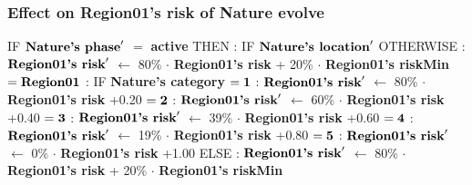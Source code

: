 \documentclass{article}%
\begin{document}
%
\subsubsection{Effect on Region01's risk of Nature evolve}%
\label{ssubsec:Effect on Region01's risk of Nature evolve}%
\begin{flushleft}%
IF %
$\mbox{\textbf{Nature's phase}} '$%
$=$%
\textbf{active}%
\linebreak%
\hspace*{2em}%
THEN %
: %
IF %
$\mbox{\textbf{Nature's location}} '$%
\linebreak%
\hspace*{4em}%
OTHERWISE %
: %
$\mbox{\textbf{Region01's risk}} '$%
$\leftarrow$%
80\%%
$\cdot$%
\textbf{Region01's risk}%
+%
20\%%
$\cdot$%
\textbf{Region01's riskMin}%
\linebreak%
\hspace*{4em}%
$= \mbox{\textbf{Region01}}$%
: %
IF %
\textbf{Nature's category}%
\linebreak%
\hspace*{6em}%
$= \mbox{\textbf{1}}$%
: %
$\mbox{\textbf{Region01's risk}} '$%
$\leftarrow$%
80\%%
$\cdot$%
\textbf{Region01's risk}%
+0.20%
\linebreak%
\hspace*{6em}%
$= \mbox{\textbf{2}}$%
: %
$\mbox{\textbf{Region01's risk}} '$%
$\leftarrow$%
60\%%
$\cdot$%
\textbf{Region01's risk}%
+0.40%
\linebreak%
\hspace*{6em}%
$= \mbox{\textbf{3}}$%
: %
$\mbox{\textbf{Region01's risk}} '$%
$\leftarrow$%
39\%%
$\cdot$%
\textbf{Region01's risk}%
+0.60%
\linebreak%
\hspace*{6em}%
$= \mbox{\textbf{4}}$%
: %
$\mbox{\textbf{Region01's risk}} '$%
$\leftarrow$%
19\%%
$\cdot$%
\textbf{Region01's risk}%
+0.80%
\linebreak%
\hspace*{6em}%
$= \mbox{\textbf{5}}$%
: %
$\mbox{\textbf{Region01's risk}} '$%
$\leftarrow$%
0\%%
$\cdot$%
\textbf{Region01's risk}%
+1.00%
\linebreak%
\hspace*{2em}%
ELSE %
: %
$\mbox{\textbf{Region01's risk}} '$%
$\leftarrow$%
80\%%
$\cdot$%
\textbf{Region01's risk}%
+%
20\%%
$\cdot$%
\textbf{Region01's riskMin}%
\end{flushleft}

%
\end{document}
